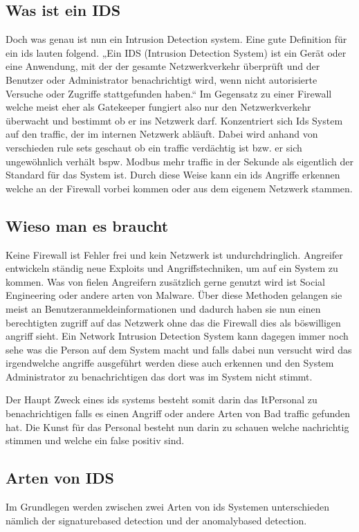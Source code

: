 \documentclass[letterpaper,10pt,ngerman]{sphinxmanual}
\begin{document}
\subsection{Was ist ein IDS}
\label{\detokenize{ids:was-ist-ein-ids}}
Doch was genau ist nun ein Intrusion Detection system. Eine gute Definition für ein ids
lauten folgend. „Ein IDS (Intrusion Detection System) ist ein Gerät oder eine Anwendung,
mit der der gesamte Netzwerkverkehr überprüft und der Benutzer oder Administrator
benachrichtigt wird, wenn nicht autorisierte Versuche oder Zugriffe stattgefunden haben.“
Im Gegensatz zu einer Firewall welche meist eher als Gatekeeper fungiert also nur den
Netzwerkverkehr überwacht und bestimmt ob er ins Netzwerk darf. Konzentriert sich Ids
System auf den traffic, der im internen Netzwerk abläuft. Dabei wird anhand von
verschieden rule sets geschaut ob ein traffic verdächtig ist bzw. er sich ungewöhnlich
verhält bspw. Modbus mehr traffic in der Sekunde als eigentlich der Standard für das
System ist. Durch diese Weise kann ein ids Angriffe erkennen welche an der Firewall
vorbei kommen oder aus dem eigenem Netzwerk stammen.


\subsection{Wieso man es braucht}
\label{\detokenize{ids:wieso-man-es-braucht}}
Keine Firewall ist Fehler frei und kein Netzwerk ist undurchdringlich. Angreifer
entwickeln ständig neue Exploits und Angriffstechniken, um auf ein System zu kommen.
Was von fielen Angreifern zusätzlich gerne genutzt wird ist Social Engineering oder
andere arten von Malware. Über diese Methoden gelangen sie meist an Benutzeranmeldeinformationen
und dadurch haben sie nun einen berechtigten zugriff auf das Netzwerk ohne das die
Firewall dies als böswilligen angriff sieht. Ein Network Intrusion Detection System kann
dagegen immer noch sehe was die Person auf dem System macht und falls dabei nun versucht
wird das irgendwelche angriffe ausgeführt werden diese auch erkennen und den System
Administrator zu benachrichtigen das dort was im System nicht stimmt.

Der Haupt Zweck eines ids systems besteht somit darin das It\sphinxhyphen{}Personal zu benachrichtigen
falls es einen Angriff oder andere Arten von Bad traffic gefunden hat. Die Kunst für das
Personal besteht nun darin zu schauen welche nachrichtig stimmen und welche ein false
positiv sind.


\subsection{Arten von IDS}
\label{\detokenize{ids:arten-von-ids}}
Im Grundlegen werden zwischen zwei Arten von ids Systemen unterschieden nämlich der signature\sphinxhyphen{}based detection
und der anomaly\sphinxhyphen{}based detection.
\end{document}
